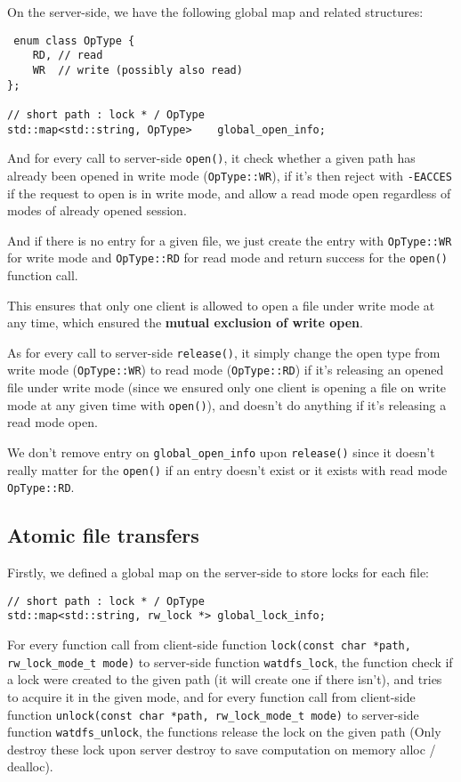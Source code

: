 \documentclass[11pt,a4paper]{article}
\begin{document}
On the server-side, we have the following global map and related structures:

\begin{lstlisting}
 enum class OpType {
    RD, // read
    WR  // write (possibly also read)
};

// short path : lock * / OpType
std::map<std::string, OpType>    global_open_info;	
\end{lstlisting}

And for every call to server-side \texttt{open()}, it check whether a given path has already been opened in write mode (\texttt{OpType::WR}), if it's then reject with \texttt{-EACCES} if the request to open is in write mode, and allow a read mode open regardless of modes of already opened session. 

And if there is no entry for a given file, we just create the entry with \texttt{OpType::WR} for write mode and \texttt{OpType::RD} for read mode and return success for the \texttt{open()} function call.

 This ensures that only one client is allowed to open a file under write mode at any time, which ensured the \textbf{mutual exclusion of write open}.

As for every call to server-side \texttt{release()}, it simply change the open type from write mode (\texttt{OpType::WR}) to read mode (\texttt{OpType::RD}) if it's releasing an opened file under write mode (since we ensured only one client is opening a file on write mode at any given time with \texttt{open()}), and doesn't do anything if it's releasing a read mode open. 

We don't remove entry on \texttt{global\_open\_info} upon \texttt{release()} since it doesn't really matter for the \texttt{open()} if an entry doesn't exist or it exists with read mode \texttt{OpType::RD}.

\subsection{Atomic file transfers}

Firstly, we defined a global map on the server-side to store locks for each file:
\begin{lstlisting}
// short path : lock * / OpType
std::map<std::string, rw_lock *> global_lock_info;
\end{lstlisting}

For every function call from client-side function \texttt{lock(const char *path, rw\_lock\_mode\_t mode)} to server-side function \texttt{watdfs\_lock}, the function check if a lock were created to the given path (it will create one if there isn't), and tries to acquire it in the given mode, and for every function call from client-side function \texttt{unlock(const char *path, rw\_lock\_mode\_t mode)} to server-side function \texttt{watdfs\_unlock}, the functions release the lock on the given path (Only destroy these lock upon server destroy to save computation on memory alloc / dealloc).
\end{document}
